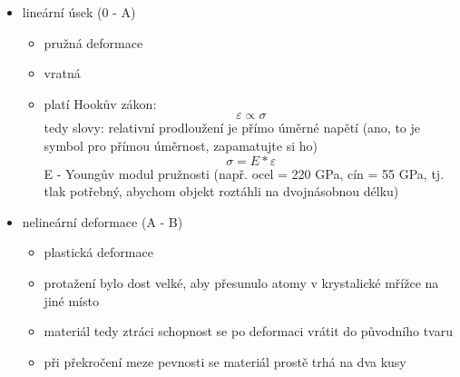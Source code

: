 \documentclass{article}
\begin{document}
      \begin{itemize}
        \item lineární úsek (0 - A)
        \begin{itemize}
          \item pružná deformace
          \item vratná
          \item platí Hookův zákon:
            \begin{equation*}
              \varepsilon \propto \sigma
            \end{equation*}
          tedy slovy: relativní prodloužení je přímo úměrné napětí (ano, to je symbol pro přímou úměrnost, zapamatujte si ho)
            \begin{equation*}
              \sigma = E*\varepsilon
            \end{equation*}
          E - Youngův modul pružnosti (např. ocel = 220 GPa, cín = 55 GPa, tj. tlak potřebný, abychom objekt roztáhli na dvojnásobnou délku)
        \end{itemize}
        \item nelineární deformace (A - B)
        \begin{itemize}
          \item plastická deformace
          \item protažení bylo dost velké, aby přesunulo atomy v krystalické mřížce na jiné místo
          \item materiál tedy ztráci schopnost se po deformaci vrátit do původního tvaru
          \item při překročení meze pevnosti se materiál prostě trhá na dva kusy
        \end{itemize}
      \end{itemize}
\end{document}
